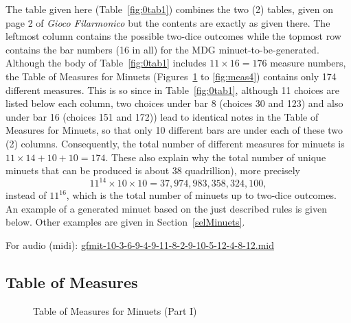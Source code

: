 \documentclass[a4paper,x11names,svgnames,10pt]{article}
\begin{document}
{The table given here (Table~\ref{fig:0tab1}) combines the two (2) tables, given on page 2 of {\it Gioco Filarmonico} but the contents are exactly as given there.  The leftmost column contains the possible two-dice outcomes while the topmost row contains the bar numbers (16 in all) for the MDG minuet-to-be-generated. \\

Although the body of Table~\ref{fig:0tab1} includes $11\times 16 = 176$ measure numbers, the Table of Measures for Minuets (Figures~\ref{fig:meas1} to \ref{fig:meas4}) contains only 174 different measures.  This is so since in Table~\ref{fig:0tab1}, although 11 choices are listed below each column, two choices under bar 8 (choices 30 and 123) and also under bar 16 (choices 151 and 172)) lead to identical notes in the Table of Measures for Minuets, so that only 10 different bars are under each of these two (2) columns. Consequently, the total number of different measures for minuets is $11\times 14 + 10 + 10 = 174$. These also explain why the total number of unique minuets that can be produced is about 38 quadrillion), more precisely $$11^{14} \times 10 \times 10 = 37,974,983,358,324,100,$$ instead of $11^{16}$, which is the total number of minuets up to two-dice outcomes. \\

An example of a generated minuet based on the just described rules is given below.  Other examples are given in Section~\ref{selMinuets}.

\begin{figure}[H]
	\centering
	\def\svgwidth{\columnwidth}
	
\end{figure}
\nopagebreak[4]
\vspace{-0.15in}
{\scriptsize For audio (midi): \hyperref{./gfmit-10-3-6-9-4-9-11-8-2-9-10-5-12-4-8-12.mid}{}{}{gfmit-10-3-6-9-4-9-11-8-2-9-10-5-12-4-8-12.mid}}


\nopagebreak[4]
\subsection{Table of Measures}\label{tableMeas}

\begin{figure}[H]
	\centering
	\def\svgwidth{0.975\columnwidth}
	
	\caption{Table of Measures for Minuets (Part I)}
	\label{fig:meas1}
\end{figure}

}
\end{document}
